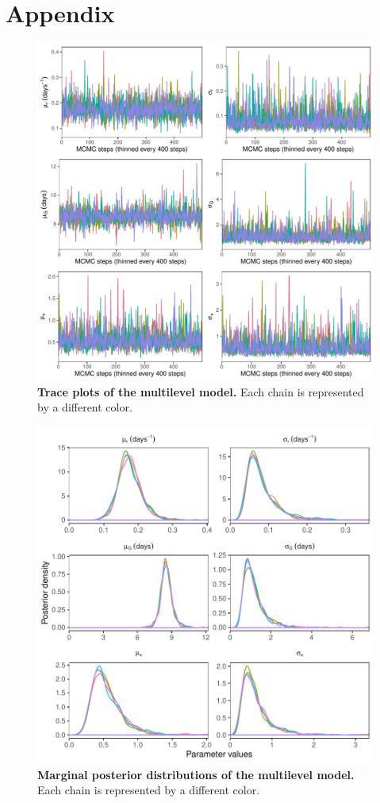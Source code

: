 \documentclass[12pt]{article}
\begin{document}


\pagebreak
\appendix
\renewcommand\thefigure{A\arabic{figure}}
\setcounter{figure}{0}    
\section*{Appendix}

\begin{figure}[!h]
\includegraphics[width=\textwidth]{posterior_chain.pdf}
\caption{
\textbf{Trace plots of the multilevel model.}
Each chain is represented by a different color.
}
\end{figure}

\pagebreak

\begin{figure}[!h]
\includegraphics[width=\textwidth]{posterior_dist.pdf}
\caption{
\textbf{Marginal posterior distributions of the multilevel model.}
Each chain is represented by a different color.
}
\end{figure}
\end{document}
